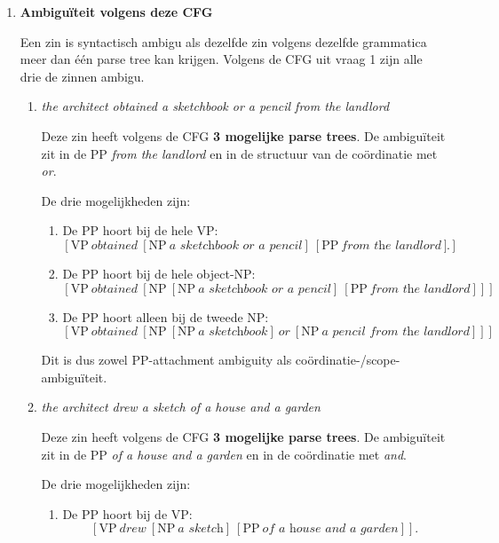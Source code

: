 \documentclass[11pt,a4paper]{article}
\newcommand{\nt}[1]{\ensuremath{\mathrm{#1}}}
\newcommand{\lex}[1]{\textit{#1}}
\begin{document}
\begin{enumerate}
\item \textbf{Ambiguïteit volgens deze CFG}

Een zin is syntactisch ambigu als dezelfde zin volgens dezelfde grammatica meer dan één parse tree kan krijgen. Volgens de CFG uit vraag 1 zijn alle drie de zinnen ambigu.

\begin{enumerate}
  \item \lex{the architect obtained a sketchbook or a pencil from the landlord}

  Deze zin heeft volgens de CFG \textbf{3 mogelijke parse trees}. De ambiguïteit zit in de $\nt{PP}$ \lex{from the landlord} en in de structuur van de coördinatie met \lex{or}.

  De drie mogelijkheden zijn:
  \begin{enumerate}
    \item De $\nt{PP}$ hoort bij de hele $\nt{VP}$:
    \[
    [\nt{VP}\ \lex{obtained}\ [\nt{NP}\ \lex{a sketchbook or a pencil}]\ [\nt{PP}\ \lex{from the landlord}]].
    \]

    \item De $\nt{PP}$ hoort bij de hele object-$\nt{NP}$:
    \[
    [\nt{VP}\ \lex{obtained}\ [\nt{NP}\ [\nt{NP}\ \lex{a sketchbook or a pencil}]\ [\nt{PP}\ \lex{from the landlord}]]].
    \]

    \item De $\nt{PP}$ hoort alleen bij de tweede $\nt{NP}$:
    \[
    [\nt{VP}\ \lex{obtained}\ [\nt{NP}\ [\nt{NP}\ \lex{a sketchbook}]\ \lex{or}\ [\nt{NP}\ \lex{a pencil from the landlord}]]].
    \]
  \end{enumerate}

  Dit is dus zowel \nt{PP}-attachment ambiguity als coördinatie-/scope-ambiguïteit.

  \item \lex{the architect drew a sketch of a house and a garden}

  Deze zin heeft volgens de CFG \textbf{3 mogelijke parse trees}. De ambiguïteit zit in de $\nt{PP}$ \lex{of a house and a garden} en in de coördinatie met \lex{and}.

  De drie mogelijkheden zijn:
  \begin{enumerate}
    \item De $\nt{PP}$ hoort bij de $\nt{VP}$:
    \[
    [\nt{VP}\ \lex{drew}\ [\nt{NP}\ \lex{a sketch}]\ [\nt{PP}\ \lex{of a house and a garden}]].
    \]


\end{enumerate}
\end{enumerate}
\end{enumerate}
\end{document}
